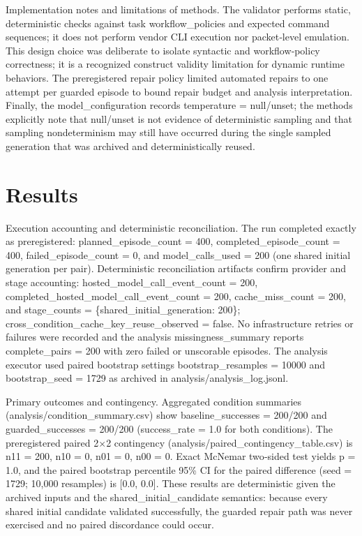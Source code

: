 \documentclass[conference]{IEEEtran}
\begin{document}
Implementation notes and limitations of methods. The validator performs static, deterministic checks against task workflow\_policies and expected command sequences; it does not perform vendor CLI execution nor packet‑level emulation. This design choice was deliberate to isolate syntactic and workflow‑policy correctness; it is a recognized construct validity limitation for dynamic runtime behaviors. The preregistered repair policy limited automated repairs to one attempt per guarded episode to bound repair budget and analysis interpretation. Finally, the model\_configuration records temperature = null/unset; the methods explicitly note that null/unset is not evidence of deterministic sampling and that sampling nondeterminism may still have occurred during the single sampled generation that was archived and deterministically reused.

\section{Results}
Execution accounting and deterministic reconciliation. The run completed exactly as preregistered: planned\_episode\_count = 400, completed\_episode\_count = 400, failed\_episode\_count = 0, and model\_calls\_used = 200 (one shared initial generation per pair). Deterministic reconciliation artifacts confirm provider and stage accounting: hosted\_model\_call\_event\_count = 200, completed\_hosted\_model\_call\_event\_count = 200, cache\_miss\_count = 200, and stage\_counts = \{shared\_initial\_generation: 200\}; cross\_condition\_cache\_key\_reuse\_observed = false. No infrastructure retries or failures were recorded and the analysis missingness\_summary reports complete\_pairs = 200 with zero failed or unscorable episodes. The analysis executor used paired bootstrap settings bootstrap\_resamples = 10000 and bootstrap\_seed = 1729 as archived in analysis/analysis\_log.jsonl.

Primary outcomes and contingency. Aggregated condition summaries (analysis/condition\_summary.csv) show baseline\_successes = 200/200 and guarded\_successes = 200/200 (success\_rate = 1.0 for both conditions). The preregistered paired 2\ensuremath{\times}2 contingency (analysis/paired\_contingency\_table.csv) is n11 = 200, n10 = 0, n01 = 0, n00 = 0. Exact McNemar two‑sided test yields p = 1.0, and the paired bootstrap percentile 95\% CI for the paired difference (seed = 1729; 10,000 resamples) is [0.0, 0.0]. These results are deterministic given the archived inputs and the shared\_initial\_candidate semantics: because every shared initial candidate validated successfully, the guarded repair path was never exercised and no paired discordance could occur.
\end{document}
